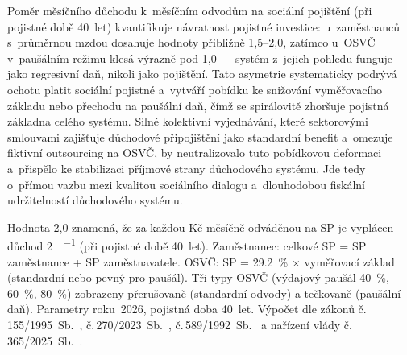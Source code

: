 Poměr měsíčního důchodu k~měsíčním odvodům na sociální pojištění (při pojistné době 40~let) kvantifikuje návratnost pojistné investice: u~zaměstnanců s~průměrnou mzdou dosahuje hodnoty přibližně 1,5--2,0, zatímco u~\ac{OSVČ} v~paušálním režimu klesá výrazně pod 1,0 --- systém z~jejich pohledu funguje jako regresivní daň, nikoli jako pojištění.
Tato asymetrie systematicky podrývá ochotu platit sociální pojistné a~vytváří pobídku ke snižování vyměřovacího základu nebo přechodu na paušální daň, čímž se spirálovitě zhoršuje pojistná základna celého systému.
Silné kolektivní vyjednávání, které sektorovými smlouvami zajišťuje důchodové připojištění jako standardní benefit a~omezuje fiktivní outsourcing na \ac{OSVČ}, by neutralizovalo tuto pobídkovou deformaci a~přispělo ke stabilizaci příjmové strany důchodového systému.
Jde tedy o~přímou vazbu mezi kvalitou sociálního dialogu a~dlouhodobou fiskální udržitelností důchodového systému.

 Hodnota 2,0 znamená, že za každou Kč měsíčně odváděnou na \ac{SP} je vyplácen důchod \SI{2}{\czk\per\month} (při pojistné době 40~let). Zaměstnanec: celkové \ac{SP} = \ac{SP} zaměstnance + \ac{SP} zaměstnavatele. \ac{OSVČ}: \ac{SP} = \SI{29.2}{\percent} × vyměřovací základ (standardní nebo pevný pro paušál). Tři typy \ac{OSVČ} (výdajový paušál \SI{40}{\percent}, \SI{60}{\percent}, \SI{80}{\percent}) zobrazeny přerušovaně (standardní odvody) a tečkovaně (paušální daň). Parametry roku~2026, pojistná doba 40~let. Výpočet dle zákonů č.\,155/1995~Sb.~\cite{zakon_zpds_1995}, č.\,270/2023~Sb.~\cite{zakon_duchreforma_2023}, č.\,589/1992~Sb.~\cite{zakon_sp_1992} a nařízení vlády č.\,365/2025~Sb.~\cite{nv_365_2025}.
